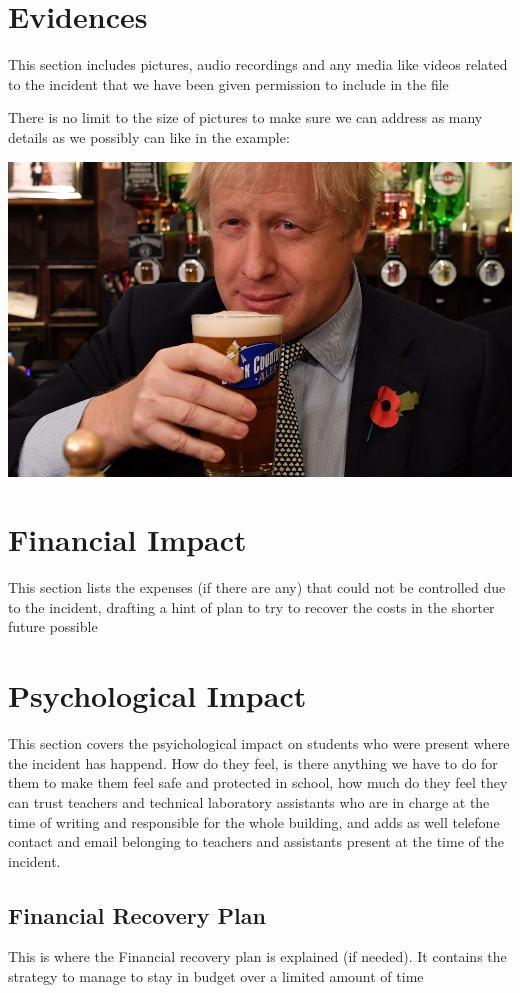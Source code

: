 \documentclass[a4paper,12pt]{article}
\begin{document}
\Large
\section{Evidences}
\normalsize
This section includes pictures, audio recordings and any media like videos related to the incident that we have been given permission to include in the file

There is no limit to the size of pictures to make sure we can address as many details as we possibly can like in the example:


\includegraphics[width=15cm]{./boris-pintoflager.jpeg}

\Large
\section{Financial Impact}
\normalsize
This section lists the expenses (if there are any) that could not be controlled due to the incident, drafting a hint of plan to try to recover the costs in the shorter future possible

\Large
\section{Psychological Impact}
\normalsize
This section covers the psyichological impact on students who were present where the incident has happend. How do they feel, is there anything we have to do for them to make them feel safe and protected in school, how much do they feel they can trust teachers and technical laboratory assistants who are in charge at the time of writing and responsible for the whole building, and adds as well telefone contact and email belonging to teachers and assistants present at the time of the incident.


\Large
\subsection {Financial Recovery Plan}
\normalsize
This is where the Financial recovery plan is explained (if needed). It contains the strategy to manage to stay in budget over a limited amount of time


\printindex
\end{document}
